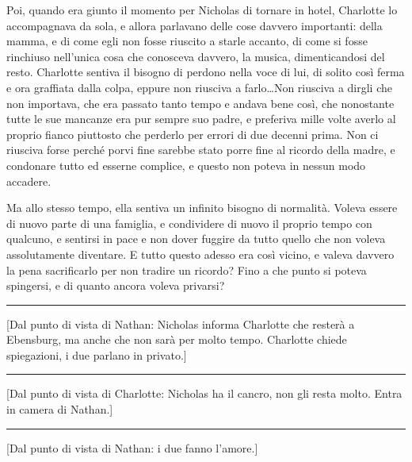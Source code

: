 \documentclass[a4paper,oneside,11pt]{memoir}
\begin{document}
Poi, quando era giunto il momento per Nicholas di tornare in hotel, Charlotte lo accompagnava da
sola, e allora parlavano delle cose davvero importanti: della mamma, e di come egli non fosse
riuscito a starle accanto, di come si fosse rinchiuso nell'unica cosa che conosceva davvero, la
musica, dimenticandosi del resto. Charlotte sentiva il bisogno di perdono nella voce di lui, di
solito così ferma e ora graffiata dalla colpa, eppure non riusciva a farlo\dots Non riusciva a
dirgli che non importava, che era passato tanto tempo e andava bene così, che nonostante tutte le
sue mancanze era pur sempre suo padre, e preferiva mille volte averlo al proprio fianco piuttosto
che perderlo per errori di due decenni prima. Non ci riusciva forse perché porvi fine sarebbe stato
porre fine al ricordo della madre, e condonare tutto ed esserne complice, e questo non poteva in
nessun modo accadere.

Ma allo stesso tempo, ella sentiva un infinito bisogno di normalità. Voleva essere di nuovo parte di
una famiglia, e condividere di nuovo il proprio tempo con qualcuno, e sentirsi in pace e non dover
fuggire da tutto quello che non voleva assolutamente diventare. E tutto questo adesso era così
vicino, e valeva davvero la pena sacrificarlo per non tradire un ricordo? Fino a che punto si
poteva spingersi, e di quanto ancora voleva privarsi?

\plainbreak{1}

[Dal punto di vista di Nathan: Nicholas informa Charlotte che resterà a Ebensburg, ma anche che non
sarà per molto tempo. Charlotte chiede spiegazioni, i due parlano in privato.]

\plainbreak{1}

[Dal punto di vista di Charlotte: Nicholas ha il cancro, non gli resta molto. Entra in camera di
Nathan.]

\plainbreak{1}

[Dal punto di vista di Nathan: i due fanno l'amore.]
\end{document}
